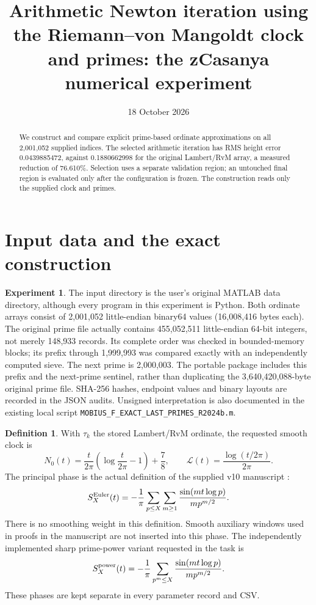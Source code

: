 \documentclass[11pt]{amsart}
\title[Arithmetic Newton iteration and prime corrections]{Arithmetic Newton iteration using the Riemann--von Mangoldt clock and primes: the zCasanya numerical experiment}
\author{}
\date{18 October 2026}
\numberwithin{equation}{section}
\theoremstyle{definition}\newtheorem{definition}[proposition]{Definition}
\newtheorem{experiment}[proposition]{Experiment}
\theoremstyle{remark}\newtheorem{remark}[proposition]{Remark}
\begin{document}
\begin{abstract}
We construct and compare explicit prime-based ordinate approximations on all
2,001,052 supplied indices. The selected arithmetic iteration has RMS height
error 0.0439885472, against 0.1880662998 for the original Lambert/RvM array,
a measured reduction of 76.610\%. Selection uses a separate validation region;
an untouched final region is evaluated only after the configuration is frozen.
The construction reads only the supplied clock and primes.
\end{abstract}
\maketitle
\tableofcontents

\section{Input data and the exact construction}\label{sec:construction}
\begin{experiment}\label{exp:inputs}
The input directory is the user's original MATLAB data directory, although
every program in this experiment is Python. Both ordinate arrays consist of
2,001,052 little-endian binary64 values (16,008,416 bytes each).
The original prime file actually contains 455,052,511 little-endian
64-bit integers, not merely 148,933 records. Its complete order was checked
in bounded-memory blocks; its prefix through 1,999,993 was compared exactly
with an independently computed sieve. The next prime is 2,000,003.
The portable package includes this prefix and the next-prime sentinel,
rather than duplicating the 3,640,420,088-byte original prime file.
SHA-256 hashes, endpoint values and binary layouts are recorded in the JSON audits.
Unsigned interpretation is also documented in the existing local script
\texttt{MOBIUS\_F\_EXACT\_LAST\_PRIMES\_R2024b.m}.
\end{experiment}

\begin{definition}\label{def:clock}
With $\tau_k$ the stored Lambert/RvM ordinate, the requested smooth clock is
\begin{equation}
N_0(t)=\frac{t}{2\pi}\left(\log\frac{t}{2\pi}-1\right)+\frac78,
\qquad \mathcal L(t)=\frac{\log(t/2\pi)}{2\pi}.
\label{eq:clock}
\end{equation}
The principal phase is the actual definition of the supplied v10 manuscript
\cite[Section 2.4, equation (2.10)]{Aynasac2026}:
\begin{equation}
S_X^{\rm Euler}(t)=-\frac1\pi\sum_{p\le X}\sum_{m\ge1}
\frac{\sin(mt\log p)}{m p^{m/2}}.
\label{eq:euler}
\end{equation}
There is no smoothing weight in this definition. Smooth auxiliary windows
used in proofs in the manuscript are not inserted into this phase.
The independently implemented sharp prime-power variant requested in the
task is
\begin{equation}
S_X^{\rm power}(t)=-\frac1\pi\sum_{p^m\le X}
\frac{\sin(mt\log p)}{m p^{m/2}}.
\label{eq:power}
\end{equation}
These phases are kept separate in every parameter record and CSV.
\end{definition}
\end{document}
